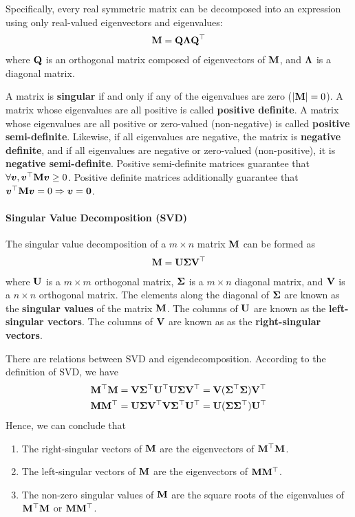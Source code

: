 Specifically, every real symmetric matrix can be decomposed into an expression using only real-valued eigenvectors and eigenvalues:
\begin{align*}
	\mathbf{M}=\mathbf{Q}\mathbf{\Lambda}\mathbf{Q}{}^\top
\end{align*}
where $\mathbf{Q}$ is an orthogonal matrix composed of eigenvectors of $\mathbf{M}$, and $\mathbf{\Lambda}$ is a diagonal matrix.

A matrix is {\bf singular} if and only if any of the eigenvalues are zero ($\left\vert \mathbf{M} \right\vert=0$). A matrix whose eigenvalues are all positive is called {\bf positive definite}. A matrix whose eigenvalues are all positive or zero-valued (non-negative) is called {\bf positive semi-definite}. Likewise, if all eigenvalues are negative, the matrix is {\bf negative definite}, and if all eigenvalues are negative or zero-valued (non-positive), it is {\bf negative semi-definite}. Positive semi-definite matrices guarantee that $\forall\boldsymbol{v}, \boldsymbol{v}{}^\top\mathbf{M}\boldsymbol{v}\geq0$. Positive definite matrices additionally guarantee that $\boldsymbol{v}{}^\top\mathbf{M}\boldsymbol{v}=0\Rightarrow\boldsymbol{v}=\boldsymbol{0}$.

\paragraph{Singular Value Decomposition (SVD)}

The singular value decomposition of a $m\times n$ matrix $\mathbf{M}$ can be formed as
\begin{align*}
	\mathbf{M}=\mathbf{U}\mathbf{\Sigma}\mathbf{V}{}^\top
\end{align*}
where $\mathbf{U}$ is a $m\times m$ orthogonal matrix, $\mathbf{\Sigma}$ is a $m\times n$ diagonal matrix, and $\mathbf{V}$ is a $n\times n$ orthogonal matrix. The elements along the diagonal of $\mathbf{\Sigma}$ are known as the {\bf singular values} of the matrix $\mathbf{M}$. The columns of $\mathbf{U}$ are known as the {\bf left-singular vectors}. The columns of $\mathbf{V}$ are known as as the {\bf right-singular vectors}.

There are relations between SVD and eigendecomposition. According to the definition of SVD, we have
\begin{align*}
	\mathbf{M}{}^\top\mathbf{M}&=\mathbf{V}\mathbf{\Sigma}{}^\top\mathbf{U}{}^\top\mathbf{U}\mathbf{\Sigma}\mathbf{V}{}^\top=\mathbf{V}(\mathbf{\Sigma}{}^\top\mathbf{\Sigma})\mathbf{V}{}^\top \\
	\mathbf{M}\mathbf{M}{}^\top&=\mathbf{U}\mathbf{\Sigma}\mathbf{V}{}^\top\mathbf{V}\mathbf{\Sigma}{}^\top\mathbf{U}{}^\top=\mathbf{U}(\mathbf{\Sigma}\mathbf{\Sigma}{}^\top)\mathbf{U}{}^\top
\end{align*}
Hence, we can conclude that
\begin{enumerate}
	\item The right-singular vectors of $\mathbf{M}$ are the eigenvectors of $\mathbf{M}{}^\top\mathbf{M}$.
	\item The left-singular vectors of $\mathbf{M}$ are the eigenvectors of $\mathbf{M}\mathbf{M}{}^\top$.
	\item The non-zero singular values of $\mathbf{M}$ are the square roots of the eigenvalues of $\mathbf{M}{}^\top\mathbf{M}$ or $\mathbf{M}\mathbf{M}{}^\top$.
\end{enumerate}


